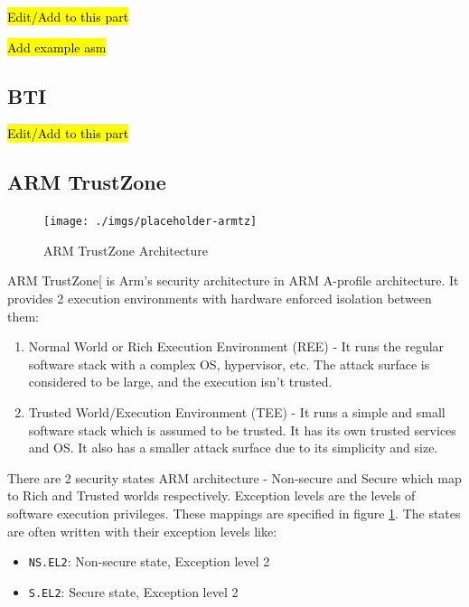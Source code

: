 \documentclass[a4paper, nobind]{templates/ociamthesis}
\providecommand{\tightlist}{%
  \setlength{\itemsep}{0pt}\setlength{\parskip}{0pt}}
\begin{document}
\hl{Edit/Add to this part}

\hl{Add example asm}

\subsection{BTI}\label{bti}

\hl{Edit/Add to this part}

\subsection{ARM TrustZone}\label{arm-trustzone}

\begin{figure}[H]

{\centering \texttt{[image: ./imgs/placeholder-armtz]} 

}

\caption{ARM TrustZone Architecture}\label{fig:armtz-arch}
\end{figure}

ARM TrustZone{[}\citeproc{ref-armtz}{3}{]} is Arm's security architecture in ARM A-profile architecture.
It provides 2 execution environments with hardware enforced isolation between them:

\begin{enumerate}
\def\labelenumi{\arabic{enumi}.}
\tightlist
\item
  Normal World or Rich Execution Environment (REE) - It runs the regular software
  stack with a complex OS, hypervisor, etc. The attack surface is considered to be large,
  and the execution isn't trusted.
\item
  Trusted World/Execution Environment (TEE) - It runs a simple and small software
  stack which is assumed to be trusted. It has its own trusted services and OS.
  It also has a smaller attack surface due to its simplicity and size.
\end{enumerate}

There are 2 security states ARM architecture - Non-secure and Secure which map
to Rich and Trusted worlds respectively.
Exception levels are the levels of software execution privileges.
These mappings are specified in figure \ref{fig:armtz-arch}.
The states are often written with their exception levels like:

\begin{itemize}
\tightlist
\item
  \texttt{NS.EL2}: Non-secure state, Exception level 2
\item
  \texttt{S.EL2}: Secure state, Exception level 2
\end{itemize}
\end{document}
